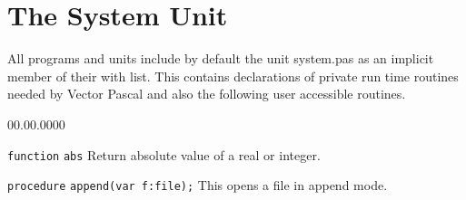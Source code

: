 {\section{The System Unit}
\label{sysunit}
All programs and units include by default the unit system.pas as an implicit
member of their with list. This contains declarations of private run time routines
needed by Vector Pascal and also the following user accessible routines.

\-

\begin{lyxlist}{00.00.0000}
\item [\texttt{function}]\texttt{abs} Return absolute value of a real or integer.
\item [\texttt{procedure}]\texttt{append(var f:file);} This opens a
file in append mode.


\end{lyxlist}}
